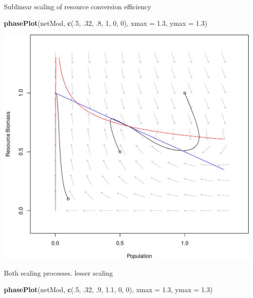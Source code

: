 \documentclass[]{article}
\newenvironment{Shaded}{\begin{snugshade}}{\end{snugshade}}
\newcommand{\KeywordTok}[1]{\textcolor[rgb]{0.13,0.29,0.53}{\textbf{{#1}}}}
\newcommand{\DataTypeTok}[1]{\textcolor[rgb]{0.13,0.29,0.53}{{#1}}}
\newcommand{\DecValTok}[1]{\textcolor[rgb]{0.00,0.00,0.81}{{#1}}}
\newcommand{\FloatTok}[1]{\textcolor[rgb]{0.00,0.00,0.81}{{#1}}}
\newcommand{\NormalTok}[1]{{#1}}
\begin{document}
Sublinear scaling of resource conversion efficiency

\begin{Shaded}
\begin{Highlighting}[]
\KeywordTok{phasePlot}\NormalTok{(netMod, }\KeywordTok{c}\NormalTok{(.}\DecValTok{5}\NormalTok{, .}\DecValTok{32}\NormalTok{, .}\DecValTok{8}\NormalTok{, }\DecValTok{1}\NormalTok{, }\DecValTok{0}\NormalTok{, }\DecValTok{0}\NormalTok{), }\DataTypeTok{xmax =} \FloatTok{1.3}\NormalTok{, }\DataTypeTok{ymax =} \FloatTok{1.3}\NormalTok{)}
\end{Highlighting}
\end{Shaded}

\includegraphics{consumerresource_files/figure-latex/unnamed-chunk-6-1.pdf}

Both scaling processes. lesser scaling

\begin{Shaded}
\begin{Highlighting}[]
\KeywordTok{phasePlot}\NormalTok{(netMod, }\KeywordTok{c}\NormalTok{(.}\DecValTok{5}\NormalTok{, .}\DecValTok{32}\NormalTok{, .}\DecValTok{9}\NormalTok{, }\FloatTok{1.1}\NormalTok{, }\DecValTok{0}\NormalTok{, }\DecValTok{0}\NormalTok{), }\DataTypeTok{xmax =} \FloatTok{1.3}\NormalTok{, }\DataTypeTok{ymax =} \FloatTok{1.3}\NormalTok{)}
\end{Highlighting}
\end{Shaded}
\end{document}
